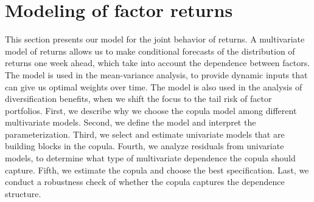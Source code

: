 
\section{Modeling of factor returns} %
\label{sec:modeling_of_factor_returns}

This section presents our model for the joint behavior of returns. A multivariate model of returns allows us to make conditional forecasts of the distribution of returns one week ahead, which take into account the dependence between factors. The model is used in the mean-variance analysis, to provide dynamic inputs that can give us optimal weights over time. The model is also used in the analysis of diversification benefits, when we shift the focus to the tail risk of factor portfolios. First, we describe why we choose the copula model among different multivariate models. Second, we define the model and interpret the parameterization. Third, we select and estimate univariate models that are building blocks in the copula. Fourth, we analyze residuals from univariate models, to determine what type of multivariate dependence the copula should capture. Fifth, we estimate the copula and choose the best specification. Last, we conduct a robustness check of whether the copula captures the dependence structure.







